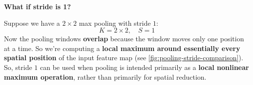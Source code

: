 \highspace
\begin{flushleft}
    \textcolor{Red2}{ \textbf{What if stride is 1?}}
\end{flushleft}
Suppose we have a $2 \times 2$ max pooling with stride $1$:
\begin{equation*}
    K = 2 \times 2, \quad S = 1
\end{equation*}
Now the pooling windows \textbf{overlap} because the window moves only one position at a time. So we're computing a \textbf{local maximum around essentially every spatial position} of the input feature map (see \autoref{fig:pooling-stride-comparison}). So, stride $1$ can be used when pooling is intended primarily as a \textbf{local nonlinear maximum operation}, rather than primarily for spatial reduction.

\highspace
